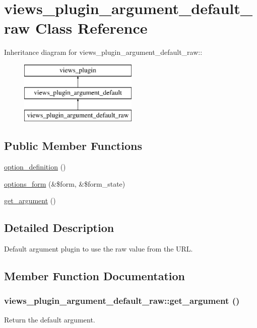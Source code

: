 \hypertarget{classviews__plugin__argument__default__raw}{
\section{views\_\-plugin\_\-argument\_\-default\_\-raw Class Reference}
\label{classviews__plugin__argument__default__raw}
}
Inheritance diagram for views\_\-plugin\_\-argument\_\-default\_\-raw::\begin{figure}[H]
\begin{center}
\leavevmode
\includegraphics[height=3cm]{classviews__plugin__argument__default__raw}
\end{center}
\end{figure}
\subsection*{Public Member Functions}
\begin{DoxyCompactItemize}
\item 
\hyperlink{classviews__plugin__argument__default__raw_a0301eba461bac2c3b80dde1978c476fe}{option\_\-definition} ()
\item 
\hyperlink{classviews__plugin__argument__default__raw_a59d56d66b37523fc25b7a83f097c4f76}{options\_\-form} (\&\$form, \&\$form\_\-state)
\item 
\hyperlink{classviews__plugin__argument__default__raw_ada03531d4b1fb35b222662c5f44e0eec}{get\_\-argument} ()
\end{DoxyCompactItemize}


\subsection{Detailed Description}
Default argument plugin to use the raw value from the URL. 

\subsection{Member Function Documentation}
\hypertarget{classviews__plugin__argument__default__raw_ada03531d4b1fb35b222662c5f44e0eec}{
\subsubsection[{get\_\-argument}]{\setlength{\rightskip}{0pt plus 5cm}views\_\-plugin\_\-argument\_\-default\_\-raw::get\_\-argument ()}}
\label{classviews__plugin__argument__default__raw_ada03531d4b1fb35b222662c5f44e0eec}
Return the default argument.

